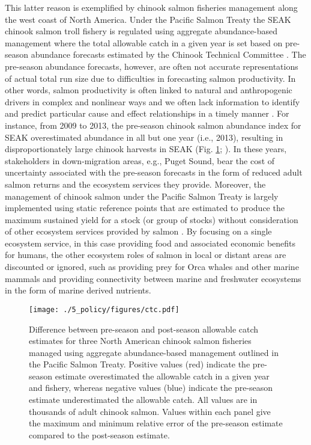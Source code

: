This latter reason is exemplified by chinook salmon fisheries management along
the west coast of North America. Under the Pacific Salmon Treaty the SEAK
chinook salmon troll fishery is regulated using aggregate abundance-based
management where the total allowable catch in a given year is set based on
pre-season abundance forecasts estimated by the Chinook Technical Committee
\citep[Annex IV, Chapter 3, Section 6]{PST2014}. The pre-season
abundance forecasts, however, are often not accurate representations of actual
total run size due to difficulties in forecasting salmon productivity. In other
words, salmon productivity is often linked to natural and anthropogenic drivers
in complex and nonlinear ways and we often lack information to identify and
predict particular cause and effect relationships in a timely manner
\citep{Peterman2012, Malick2016a, Myers1998b}. For instance, from 2009 to 2013,
the pre-season chinook salmon abundance index for SEAK overestimated abundance
in all but one year (i.e., 2013), resulting in disproportionately large chinook
harvests in SEAK (Fig. \ref{fig:ebm:2}; \citealp{CTC2015a}). In these years,
stakeholders in down-migration areas, e.g., Puget Sound, bear the cost of
uncertainty associated with the pre-season forecasts in the form of reduced
adult salmon returns and the ecosystem services they provide. Moreover, the
management of chinook salmon under the Pacific Salmon Treaty is largely
implemented using static reference points that are estimated to produce the
maximum sustained yield for a stock (or group of stocks) without consideration
of other ecosystem services provided by salmon \citep{CTC2015b}. By focusing on
a single ecosystem service, in this case providing food and associated economic
benefits for humans, the other ecosystem roles of salmon in local or distant
areas are discounted or ignored, such as providing prey for Orca whales and
other marine mammals and providing connectivity between marine and freshwater
ecosystems in the form of marine derived nutrients.

\begin{figure}[htbp]
  \centering \texttt{[image: ./5\_policy/figures/ctc.pdf]}
  \caption[Difference between pre-season and post-season allowable catch
           estimates for three North American chinook salmon
           fisheries]{Difference between pre-season and post-season allowable
           catch estimates for three North American chinook salmon fisheries
           managed using aggregate abundance-based management outlined in the
           Pacific Salmon Treaty. Positive values (red) indicate the pre-season
           estimate overestimated the allowable catch in a given year and
           fishery, whereas negative values (blue) indicate the pre-season
           estimate underestimated the allowable catch. All values are in
           thousands of adult chinook salmon. Values within each panel give the
           maximum and minimum relative error of the pre-season estimate
           compared to the post-season estimate.}
  \label{fig:ebm:2}
\end{figure}

